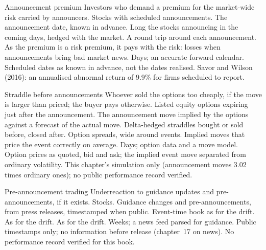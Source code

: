 \begin{strategyfile}{Announcement premium}\label{strat:s1:earnings:premium}
 Investors who demand a premium for the market-wide risk carried by announcers.
 Stocks with scheduled announcements.
 The announcement date, known in advance.
 Long the stocks announcing in the coming days, hedged with the market.
 A round trip around each announcement.
 As the premium is a risk premium, it pays with the risk: losses when announcements bring bad market news.
 Days; an accurate forward calendar.
 Scheduled dates as known in advance, not the dates realised.
 Savor and Wilson (2016): an annualised abnormal return of 9.9\% for firms scheduled to report.
\end{strategyfile}

\begin{strategyfile}{Straddle before announcements}\label{strat:s1:earnings:straddle}
 Whoever sold the options too cheaply, if the move is larger than priced; the buyer pays otherwise.
 Listed equity options expiring just after the announcement.
 The announcement move implied by the options against a forecast of the actual move.
 Delta-hedged straddles bought or sold before, closed after.
 Option spreads, wide around events.
 Implied moves that price the event correctly on average.
 Days; option data and a move model.
 Option prices as quoted, bid and ask; the implied event move separated from ordinary volatility.
 This chapter's simulation only (announcement moves 3.02 times ordinary ones); no public performance record verified.
\end{strategyfile}

\begin{strategyfile}{Pre-announcement trading}\label{strat:s1:earnings:preannounce}
 Underreaction to guidance updates and pre-announcements, if it exists.
 Stocks.
 Guidance changes and pre-announcements, from press releases, timestamped when public.
 Event-time book as for the drift.
 As for the drift.
 As for the drift.
 Weeks; a news feed parsed for guidance.
 Public timestamps only; no information before release (chapter~17 on news).
 No performance record verified for this book.
\end{strategyfile}

